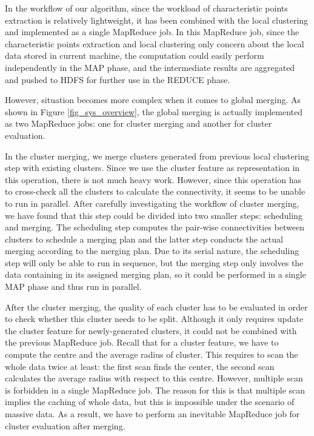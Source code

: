 \documentclass[conference]{IEEEtran}
\begin{document}
In the workflow of our algorithm, since the workload of characteristic points extraction is relatively lightweight, it has been combined with the local clustering and implemented as a single MapReduce job. In this MapReduce job, since the characteristic points extraction and local clustering only concern about the local data stored in current machine, the computation could easily perform independently in the MAP phase, and the intermediate results are aggregated and pushed to HDFS for further use in the REDUCE phase.


However, situation becomes more complex when it comes to global merging. As shown in Figure \ref{fig_sys_overview}, the global merging is actually implemented as two MapReduce jobs: one for cluster merging and another for cluster evaluation. 


In the cluster merging, we merge clusters generated from previous local clustering step with existing clusters. Since we use the cluster feature as representation in this operation, there is not much heavy work. However, since this operation has to cross-check all the clusters to calculate the connectivity, it seems to be unable to run in parallel. After carefully investigating the workflow of cluster merging, we have found that this step could be divided into two smaller steps: scheduling and merging. The scheduling step computes the pair-wise connectivities between clusters to schedule a merging plan and the latter step conducts the actual merging according to the merging plan. Due to its serial nature, the scheduling step will only be able to run in sequence, but the merging step only involves the data containing in its assigned merging plan, so it could be performed in a single MAP phase and thus run in parallel.


After the cluster merging, the quality of each cluster has to be evaluated in order to check whether this cluster needs to be split. Although it only requires update the cluster feature for newly-generated clusters, it could not be combined with the previous MapReduce job. Recall that for a cluster feature, we have to compute the centre and the average radius of cluster. This requires to scan the whole data twice at least: the first scan finds the center, the second scan calculates the average radius with respect to this centre. However, multiple scan is forbidden in a single MapReduce job. The reason for this is that multiple scan implies the caching of whole data, but this is impossible under the scenario of massive data. As a result, we have to perform an inevitable MapReduce job for cluster evaluation after merging.
\end{document}

